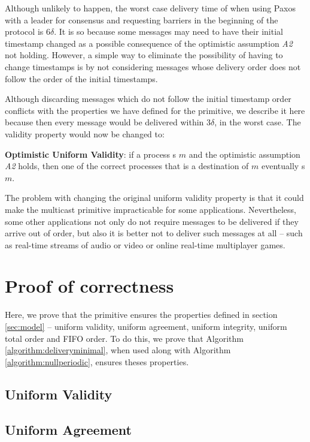 \documentclass[times, 10pt]{article}
\begin{document}
Although unlikely to happen, the worst case delivery time of \cms{} when using Paxos with a leader for consensus and requesting barriers in the beginning of the protocol is $6\delta$. It is so because some messages may need to have their initial timestamp changed as a possible consequence of the optimistic assumption \emph{A2} not holding. However, a simple way to eliminate the possibility of having to change timestamps is by not considering messages whose delivery order does not follow the order of the initial timestamps.

Although discarding messages which do not follow the initial timestamp order conflicts with the properties we have defined for the \cms{} primitive, we describe it here because then every message would be delivered within $3\delta$, in the worst case. The validity property would now be changed to:

\textbf{Optimistic Uniform Validity}: if a process \cms{}s $m$ and the optimistic assumption \emph{A2} holds, then one of the correct processes that is a destination of $m$ eventually \cons{}s $m$.

The problem with changing the original uniform validity property is that it could make the multicast primitive impracticable for some applications. Nevertheless, some other applications not only do not require messages to be delivered if they arrive out of order, but also it is better not to deliver such messages at all -- such as real-time streams of audio or video or online real-time multiplayer games.


\section{Proof of correctness}

Here, we prove that the \cms{} primitive ensures the properties defined in section \ref{sec:model} -- uniform validity, uniform agreement, uniform integrity, uniform total order and FIFO order. To do this, we prove that Algorithm \ref{algorithm:deliveryminimal}, when used along with Algorithm \ref{algorithm:nullperiodic}, ensures theses properties.

\subsection{Uniform Validity}

\subsection{Uniform Agreement}
\end{document}
